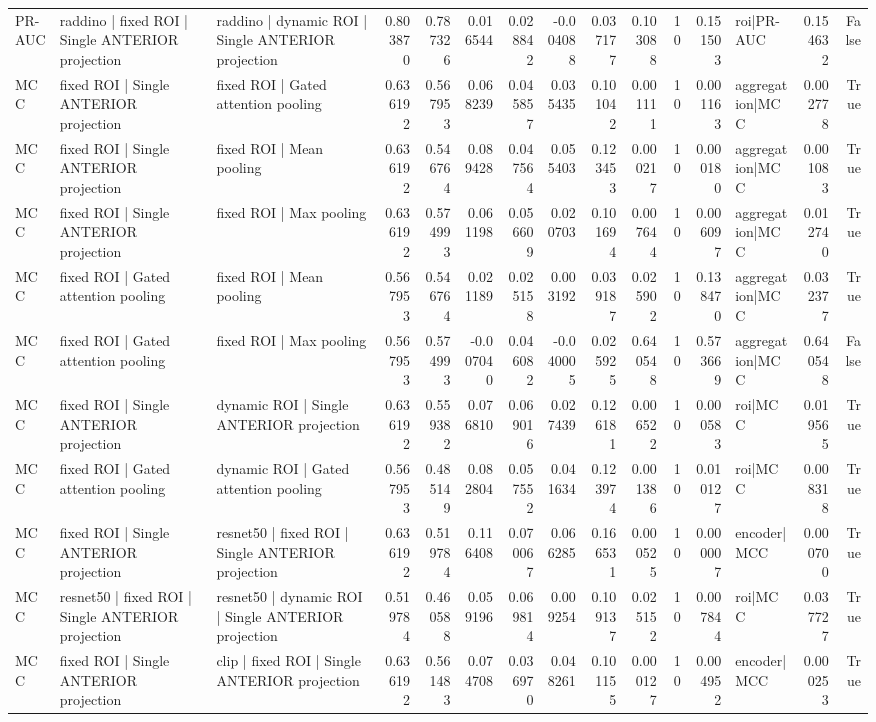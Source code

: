 \begin{table}
\begin{tabular}{lllrrrrrrrrrlrr}
PR-AUC & raddino | fixed ROI | Single ANTERIOR projection & raddino | dynamic ROI | Single ANTERIOR projection & 0.803870 & 0.787326 & 0.016544 & 0.028842 & -0.004088 & 0.037177 & 0.103088 & 10 & 0.151503 & roi|PR-AUC & 0.154632 & False \\
MCC & fixed ROI | Single ANTERIOR projection & fixed ROI | Gated attention pooling & 0.636192 & 0.567953 & 0.068239 & 0.045857 & 0.035435 & 0.101042 & 0.001111 & 10 & 0.001163 & aggregation|MCC & 0.002778 & True \\
MCC & fixed ROI | Single ANTERIOR projection & fixed ROI | Mean pooling & 0.636192 & 0.546764 & 0.089428 & 0.047564 & 0.055403 & 0.123453 & 0.000217 & 10 & 0.000180 & aggregation|MCC & 0.001083 & True \\
MCC & fixed ROI | Single ANTERIOR projection & fixed ROI | Max pooling & 0.636192 & 0.574993 & 0.061198 & 0.056609 & 0.020703 & 0.101694 & 0.007644 & 10 & 0.006097 & aggregation|MCC & 0.012740 & True \\
MCC & fixed ROI | Gated attention pooling & fixed ROI | Mean pooling & 0.567953 & 0.546764 & 0.021189 & 0.025158 & 0.003192 & 0.039187 & 0.025902 & 10 & 0.138470 & aggregation|MCC & 0.032377 & True \\
MCC & fixed ROI | Gated attention pooling & fixed ROI | Max pooling & 0.567953 & 0.574993 & -0.007040 & 0.046082 & -0.040005 & 0.025925 & 0.640548 & 10 & 0.573669 & aggregation|MCC & 0.640548 & False \\
MCC & fixed ROI | Single ANTERIOR projection & dynamic ROI | Single ANTERIOR projection & 0.636192 & 0.559382 & 0.076810 & 0.069016 & 0.027439 & 0.126181 & 0.006522 & 10 & 0.000583 & roi|MCC & 0.019565 & True \\
MCC & fixed ROI | Gated attention pooling & dynamic ROI | Gated attention pooling & 0.567953 & 0.485149 & 0.082804 & 0.057552 & 0.041634 & 0.123974 & 0.001386 & 10 & 0.010127 & roi|MCC & 0.008318 & True \\
MCC & fixed ROI | Single ANTERIOR projection & resnet50 | fixed ROI | Single ANTERIOR projection & 0.636192 & 0.519784 & 0.116408 & 0.070067 & 0.066285 & 0.166531 & 0.000525 & 10 & 0.000007 & encoder|MCC & 0.000700 & True \\
MCC & resnet50 | fixed ROI | Single ANTERIOR projection & resnet50 | dynamic ROI | Single ANTERIOR projection & 0.519784 & 0.460588 & 0.059196 & 0.069814 & 0.009254 & 0.109137 & 0.025152 & 10 & 0.007844 & roi|MCC & 0.037727 & True \\
MCC & fixed ROI | Single ANTERIOR projection & clip | fixed ROI | Single ANTERIOR projection & 0.636192 & 0.561483 & 0.074708 & 0.036970 & 0.048261 & 0.101155 & 0.000127 & 10 & 0.004952 & encoder|MCC & 0.000253 & True \\

\end{tabular}
\end{table}
